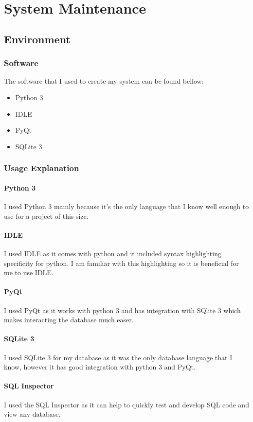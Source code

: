 \chapter{System Maintenance}
\section{Environment}
\subsection{Software}
The software that I used to create my system can be found bellow:

\begin{itemize}
\item Python 3
\item IDLE
\item PyQt
\item SQLite 3
\end{itemize}
\subsection{Usage Explanation}
\subsubsection{Python 3}
I used Python 3 mainly because it's the only language that I know well enough to use for a project of this size.
\subsubsection{IDLE}
I used IDLE as it comes with python and it included syntax highlighting specificity for python. I am familiar with this highlighting so it is beneficial for me to use IDLE.
\subsubsection{PyQt}
I used PyQt as it works with python 3 and has integration with SQlite 3 which makes interacting the database much easer.
\subsubsection{SQLite 3}
I used SQLite 3 for my database as it was the only database language that I know, however it has good integration with python 3 and PyQt.
\subsubsection{SQL Inspector}
I used the SQL Inspector as it can help to quickly test and develop SQL code and view any database.

